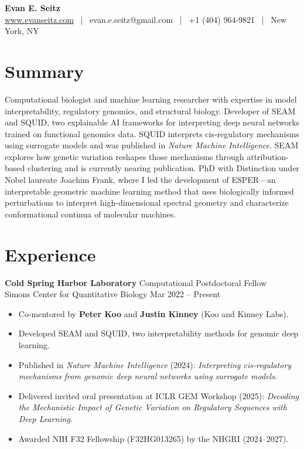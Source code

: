 \documentclass[11pt]{article}
\begin{document}
\begin{center}
    \textbf{\Large Evan E. Seitz} \\
    \href{https://www.evanseitz.com}{www.evanseitz.com} ~|~ evan.e.seitz@gmail.com ~|~ +1 (404) 964-9821 ~|~ New York, NY
\end{center}

\section*{Summary}
Computational biologist and machine learning researcher with expertise in model interpretability, regulatory genomics, and structural biology. Developer of SEAM and SQUID, two explainable AI frameworks for interpreting deep neural networks trained on functional genomics data. SQUID interprets cis-regulatory mechanisms using surrogate models and was published in \textit{Nature Machine Intelligence}. SEAM explores how genetic variation reshapes those mechanisms through attribution-based clustering and is currently nearing publication. PhD with Distinction under Nobel laureate Joachim Frank, where I led the development of ESPER—an interpretable geometric machine learning method that uses biologically informed perturbations to interpret high-dimensional spectral geometry and characterize conformational continua of molecular machines.

\section*{Experience}
\textbf{Cold Spring Harbor Laboratory} \hfill Computational Postdoctoral Fellow\\
Simons Center for Quantitative Biology \hfill Mar 2022 -- Present
\begin{itemize}
    \item Co-mentored by \textbf{Peter Koo} and \textbf{Justin Kinney} (Koo and Kinney Labs).
    \item Developed SEAM and SQUID, two interpretability methods for genomic deep learning.
    \item Published in \textit{Nature Machine Intelligence} (2024): \textit{Interpreting cis-regulatory mechanisms from genomic deep neural networks using surrogate models}.
    \item Delivered invited oral presentation at ICLR GEM Workshop (2025): \textit{Decoding the Mechanistic Impact of Genetic Variation on Regulatory Sequences with Deep Learning}.
    \item Awarded NIH F32 Fellowship (F32HG013265) by the NHGRI (2024--2027).
\end{itemize}
\end{document}
